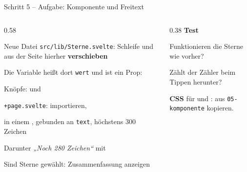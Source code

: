\begin{frame}[fragile]{Schritt 5 -- Aufgabe: Komponente und Freitext}
  \footnotesize
  \begin{columns}[onlytextwidth,t]
    \begin{column}{0.58\textwidth}
      \begin{tugenumerate}
        \item Neue Datei \texttt{src/lib/Sterne.svelte}: Schleife und 
              aus der Seite hierher \textbf{verschieben}
        \item Die Variable heißt dort \texttt{wert} und ist ein Prop:
        \item Knöpfe:  und 
        \item \texttt{+page.svelte}: importieren, 
        \item {} in einem , gebunden an \texttt{text},
              höchstens 300 Zeichen
        \item Darunter \emph{„Noch 280 Zeichen“} mit 
        \item Sind Sterne gewählt: Zusammenfassung anzeigen
      \end{tugenumerate}
    \end{column}
    \begin{column}{0.38\textwidth}
      \textbf{Test}
      \begin{tugitemize}
        \item Funktionieren die Sterne wie vorher?
        \item Zählt der Zähler beim Tippen herunter?
      \end{tugitemize}
      \vspace{0.5em}
      \textbf{CSS} für  und :
      aus \texttt{05-komponente} kopieren.
    \end{column}
  \end{columns}
\end{frame}

